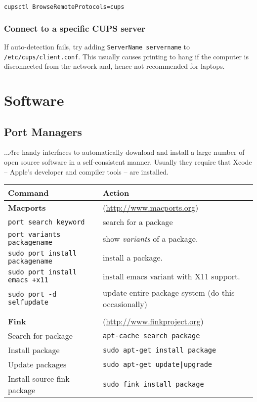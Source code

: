 \documentclass[a4paper,10pt]{article}
\begin{document}
\verb+cupsctl BrowseRemoteProtocols=cups+

\subsubsection{Connect to a specific CUPS server}
If auto-detection fails, try adding \verb"ServerName servername" to \verb"/etc/cups/client.conf". This usually causes printing to hang if the computer is disconnected from the network and, hence not recommended for laptops.


\section{Software}
\subsection{\label{sec:ports}Port Managers}
..$\mathcal{A}$re handy interfaces to automatically download and install a large number of open source software in a self-consistent manner. Usually they require that Xcode -- Apple's developer and compiler tools -- are installed.
\begin{table}[h!]
\center
\begin{small}
\begin{tabular}{ll}\hline\hline
Command              & Action \\\hline
\textbf{Macports}    & (\url{http://www.macports.org})\\
\verb"port search keyword" & search for a package\\
\verb+port variants packagename+ & show \emph{variants} of a package.\\
\verb"sudo port install packagename" & install a package.\\
\verb"sudo port install emacs +x11" & install emacs variant with X11 support.\\
\verb"sudo port -d selfupdate" & update entire package system (do this occasionally)\\
\\
\textbf{Fink}       & (\url{http://www.finkproject.org})\\
Search for package  & \verb"apt-cache search package"\\
Install package     & \verb"sudo apt-get install package"\\
Update packages     &  \verb"sudo apt-get update|upgrade"\\
Install source fink package & \verb"sudo fink install package"\\\hline
\end{tabular}\end{small}\end{table}
\end{document}
